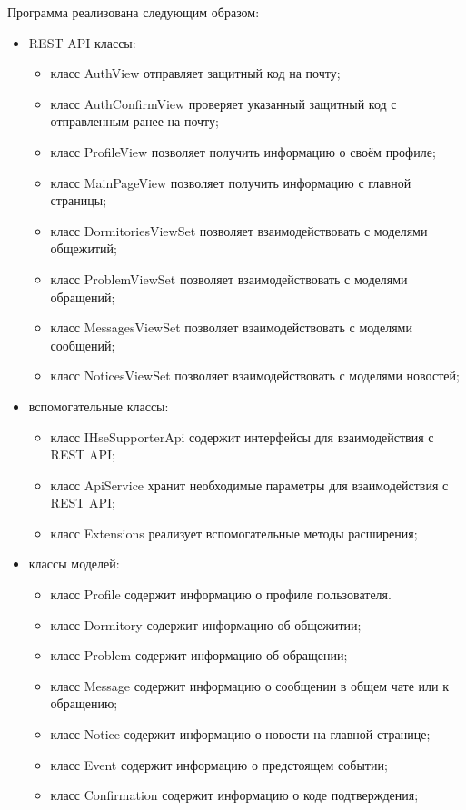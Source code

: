 \documentclass{../includes/TechDoc}
\begin{document}
    Программа реализована следующим образом:
    \begin{itemize}
        \item REST API классы:
        \begin{itemize}
            \item класс AuthView отправляет защитный код на почту;
            \item класс AuthConfirmView проверяет указанный защитный код с отправленным ранее на почту;
            \item класс ProfileView позволяет получить информацию о своём профиле;
            \item класс MainPageView позволяет получить информацию с главной страницы;
            \item класс DormitoriesViewSet позволяет взаимодействовать с моделями общежитий;
            \item класс ProblemViewSet позволяет взаимодействовать с моделями обращений;
            \item класс MessagesViewSet позволяет взаимодействовать с моделями сообщений;
            \item класс NoticesViewSet позволяет взаимодействовать с моделями новостей;
        \end{itemize}
        \item вспомогательные классы:
        \begin{itemize}
            \item класс IHseSupporterApi содержит интерфейсы для взаимодействия с REST API;
            \item класс ApiService хранит необходимые параметры для взаимодействия с REST API;
            \item класс Extensions реализует вспомогательные методы расширения;
        \end{itemize}
        \item классы моделей:
        \begin{itemize}
            \item класс Profile содержит информацию о профиле пользователя.
            \item класс Dormitory содержит информацию об общежитии;
            \item класс Problem содержит информацию об обращении;
            \item класс Message содержит информацию о сообщении в общем чате или к обращению;
            \item класс Notice содержит информацию о новости на главной странице;
            \item класс Event содержит информацию о предстоящем событии;
            \item класс Confirmation содержит информацию о коде подтверждения;
        \end{itemize}
    \end{itemize}
\end{document}
